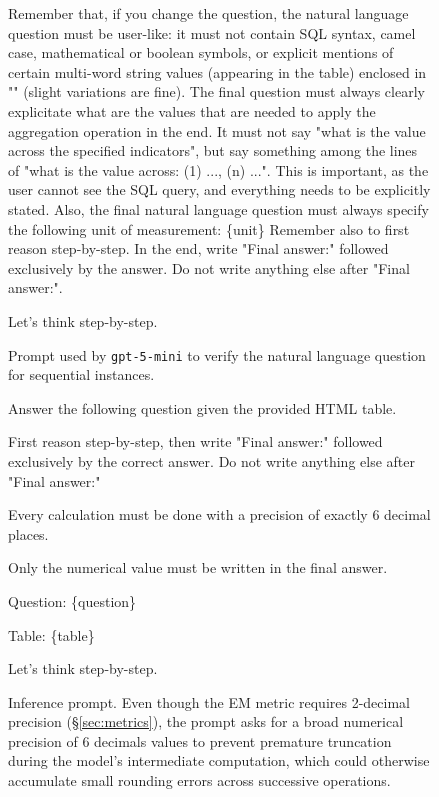 \begin{figure}[t!]
\begin{tcolorbox}[
  title=Sequential question verification prompt,
  fonttitle=\bfseries,
  sharp corners=all,
]
Remember that, if you change the question, the natural language question must be user-like: it must not contain SQL syntax, camel case, mathematical or boolean symbols, or explicit mentions of certain multi-word string values (appearing in the table) enclosed in "" (slight variations are fine).
The final question must always clearly explicitate what are the values that are needed to apply the aggregation operation in the end. It must not say "what is the value across the specified indicators", but say something among the lines of "what is the value across: (1) ..., (n) ...". This is important, as the user cannot see the SQL query, and everything needs to be explicitly stated.
Also, the final natural language question must always specify the following unit of measurement: \{unit\}
Remember also to first reason step-by-step. In the end, write "Final answer:" followed exclusively by the answer. Do not write anything else after "Final answer:".

Let's think step-by-step.

\end{tcolorbox}
\caption{Prompt used by \texttt{gpt-5-mini} to verify the natural language question for sequential instances.}
\label{fig:seq_ver_prompt}
\end{figure}



\begin{figure}[t!]\small
\centering
\begin{tcolorbox}[
  title=Inference prompt,
  fonttitle=\bfseries,
  sharp corners=all,
]

Answer the following question given the provided HTML table.

First reason step-by-step, then write "Final answer:" followed exclusively by the correct answer. Do not write anything else after "Final answer:"

Every calculation must be done with a precision of exactly 6 decimal places.

Only the numerical value must be written in the final answer.

\vspace{\baselineskip}
Question: \{question\}

Table:
\{table\}
\vspace{\baselineskip}

Let's think step-by-step. 

\end{tcolorbox}
\caption{Inference prompt. Even though the EM metric requires 2-decimal precision (\S\ref{sec:metrics}), the prompt asks for a broad numerical precision of 6 decimals values to prevent premature truncation during the model's intermediate computation, which could otherwise accumulate small rounding errors across successive operations.}
\label{fig:inference_prompt}
\end{figure}


